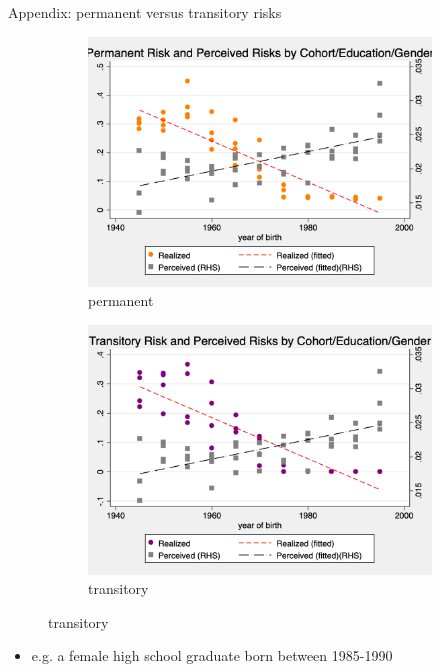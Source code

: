 \documentclass{beamer}
\begin{document}
\begin{frame}{Appendix: permanent versus transitory risks}
	\label{appendix:cohort_age_component_compare}
	\begin{figure}[ht]
		\centering
		\begin{subfigure}[b]{0.44\textwidth}
			\caption{permanent}
			\includegraphics[width=\textwidth]{figures/log_wage_pshk_by_byear_5yr_edu_gender_compare.png}
		\end{subfigure}
		\begin{subfigure}[b]{0.44\textwidth}
			\caption{transitory}
			\includegraphics[width=\textwidth]{figures/log_wage_tshk_by_byear_5yr_edu_gender_compare.png}
		\end{subfigure} 
	\end{figure}
	\begin{itemize}
		\item e.g. a female high school graduate born between 1985-1990
		\quad  \hyperlink{cohort_age_component_compare}{}  
	\end{itemize}
\end{frame}
\end{document}
